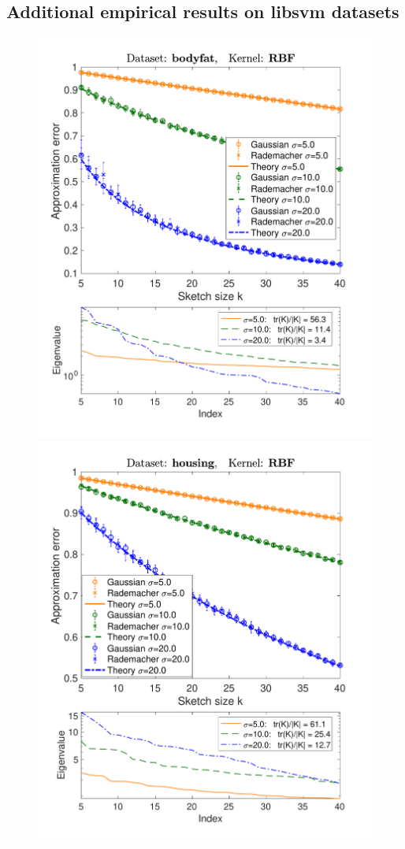 \documentclass[../../thesis.tex]{subfiles}
\begin{document}
\subsection{Additional empirical results on libsvm datasets}
\label{a:experiments}

\begin{figure}[htbp]
  \centering
  \includegraphics[width=.47\textwidth]{bodyfat-supp}\nobreak\includegraphics[width=.47\textwidth]{housing-supp}

\end{figure}
\end{document}

